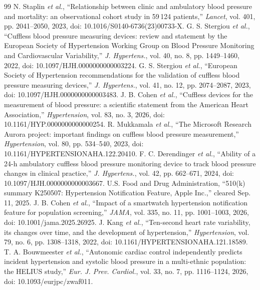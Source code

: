 \documentclass[conference]{IEEEtran}
\begin{document}
\begin{thebibliography}{99}\footnotesize
{} N. Staplin \emph{et al.}, ``Relationship between clinic and ambulatory blood pressure and mortality: an observational cohort study in 59\,124 patients,'' \emph{Lancet}, vol. 401, pp. 2041--2050, 2023, doi: 10.1016/S0140-6736(23)00733-X.
 G. S. Stergiou \emph{et al.}, ``Cuffless blood pressure measuring devices: review and statement by the European Society of Hypertension Working Group on Blood Pressure Monitoring and Cardiovascular Variability,'' \emph{J. Hypertens.}, vol. 40, no. 8, pp. 1449--1460, 2022, doi: 10.1097/HJH.0000000000003224.
 G. S. Stergiou \emph{et al.}, ``European Society of Hypertension recommendations for the validation of cuffless blood pressure measuring devices,'' \emph{J. Hypertens.}, vol. 41, no. 12, pp. 2074--2087, 2023, doi: 10.1097/HJH.0000000000003483.
 J. B. Cohen \emph{et al.}, ``Cuffless devices for the measurement of blood pressure: a scientific statement from the American Heart Association,'' \emph{Hypertension}, vol. 83, no. 3, 2026, doi: 10.1161/HYP.0000000000000254.
 R. Mukkamala \emph{et al.}, ``The Microsoft Research Aurora project: important findings on cuffless blood pressure measurement,'' \emph{Hypertension}, vol. 80, pp. 534--540, 2023, doi: 10.1161/HYPERTENSIONAHA.122.20410.
 F. C. Derendinger \emph{et al.}, ``Ability of a 24-h ambulatory cuffless blood pressure monitoring device to track blood pressure changes in clinical practice,'' \emph{J. Hypertens.}, vol. 42, pp. 662--671, 2024, doi: 10.1097/HJH.0000000000003667.
 U.S. Food and Drug Administration, ``510(k) summary K250507: Hypertension Notification Feature, Apple Inc.,'' cleared Sep. 11, 2025.
 J. B. Cohen \emph{et al.}, ``Impact of a smartwatch hypertension notification feature for population screening,'' \emph{JAMA}, vol. 335, no. 11, pp. 1001--1003, 2026, doi: 10.1001/jama.2025.26925.
 J. Kang \emph{et al.}, ``Ten-second heart rate variability, its changes over time, and the development of hypertension,'' \emph{Hypertension}, vol. 79, no. 6, pp. 1308--1318, 2022, doi: 10.1161/HYPERTENSIONAHA.121.18589.
 T. A. Bouwmeester \emph{et al.}, ``Autonomic cardiac control independently predicts incident hypertension and systolic blood pressure in a multi-ethnic population: the HELIUS study,'' \emph{Eur. J. Prev. Cardiol.}, vol. 33, no. 7, pp. 1116--1124, 2026, doi: 10.1093/eurjpc/zwaf011.

\end{thebibliography}
\end{document}
